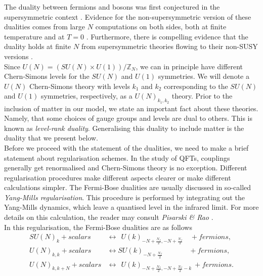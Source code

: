         \indent The duality between fermions and bosons was first conjectured in the supersymmetric context \cite{Giveon:2008zn, Benini:2011mf, Aharony:2013dha, Aharony:2014uya}. Evidence for the non-supersymmetric version of these dualities comes from large $N$ computations on both sides, both at finite temperature \cite{Aharony:2012ns}  and at $T=0$ \cite{Giombi:2011kc}. Furthermore, there is compelling evidence that the duality holds at finite $N$ from supersymmetric theories flowing to their non-SUSY versions \cite{Jain:2013gza, Gur-Ari:2015pca}.\\
        \indent Since $U(N) = (SU(N)\times U(1))/\mathbb{Z}_N$, we can in principle have different Chern-Simons levels for the $SU(N)$ and $U(1)$ symmetries. We will denote a $U(N)$ Chern-Simons theory with levels $k_1$ and $k_2$ corresponding to the $SU(N)$ and $U(1)$ symmetries, respectively, as a $U(N)_{k_1,k_2}$ theory. Prior to the inclusion of matter in our model, we state an important fact about these theories. Namely, that some choices of gauge groups and levels are dual to others. This is known as \textit{level-rank duality}. Generalising this duality to include matter is the duality that we present below.\\
\indent Before we proceed with the statement of the dualities, we need to make a brief statement about regularisation schemes. In the study of QFTs, couplings generally get renormalised and Chern-Simons theory is no exception. Different regularisation procedures make different aspects clearer or make different calculations simpler. The Fermi-Bose dualities are usually discussed in so-called \textit{Yang-Mills regularisation}. This procedure is performed by integrating out the Yang-Mills dynamics, which leave a quantised level in the infrared limit. For more details on this calculation, the reader may consult \textit{Pisarski \& Rao} \cite{PhysRevD.32.2081}.\\
        \indent In this regularisation, the Fermi-Bose dualities are as follows \cite{Aharony:2015mjs} 
            \begin{align}
                SU(N)_k + scalars &\longleftrightarrow \ \ U(k)_{-N +\frac{N_f}{2}, -N + \frac{N_f}{2}} \quad + fermions, \label{eq:Fermi-Bose_1} \\
                U(N)_{k,k} + scalars &\longleftrightarrow SU(k)_{-N +\frac{N_f}{2}}\qquad \ \ \ \quad+ fermions,  \label{eq:Fermi-Bose_2}\\
                U(N)_{k,k+N} + scalars &\longleftrightarrow \ \ U(k)_{-N +\frac{N_f}{2}, -N + \frac{N_f}{2}-k} \ + fermions.  \label{eq:Fermi-Bose_3}
            \end{align}
